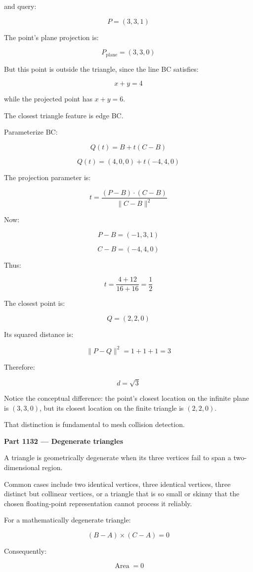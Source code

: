 and query:

\[
P=(3,3,1)
\]

The point's plane projection is:

\[
P_{\mathrm{plane}}=(3,3,0)
\]

But this point is outside the triangle, since the line BC satisfies:

\[
x+y=4
\]

while the projected point has \(x+y=6\).

The closest triangle feature is edge BC.

Parameterize BC:

\[
Q(t)=B+t(C-B)
\]

\[
Q(t)=(4,0,0)+t(-4,4,0)
\]

The projection parameter is:

\[
t=\frac{(P-B)\cdot(C-B)} {\|C-B\|^2}
\]

Now:

\[
P-B=(-1,3,1)
\]

\[
C-B=(-4,4,0)
\]

Thus:

\[
t=\frac{4+12}{16+16}=\frac12
\]

The closest point is:

\[
\boxed{Q=(2,2,0)}
\]

Its squared distance is:

\[
\|P-Q\|^2=1+1+1=3
\]

Therefore:

\[
\boxed{d=\sqrt3}
\]

Notice the conceptual difference: the point's closest location on the infinite plane is \((3,3,0)\), but its closest location on the finite triangle is \((2,2,0)\).

That distinction is fundamental to mesh collision detection.

\textbf{Part 1132 --- Degenerate triangles}

A triangle is geometrically degenerate when its three vertices fail to span a two-dimensional region.

Common cases include two identical vertices, three identical vertices, three distinct but collinear vertices, or a triangle that is so small or skinny that the chosen floating-point representation cannot process it reliably.

For a mathematically degenerate triangle:

\[
(B-A)\times(C-A)=0
\]

Consequently:

\[
\operatorname{Area}=0
\]

